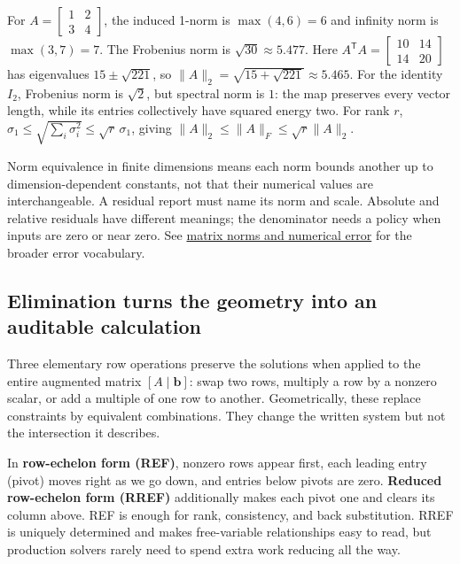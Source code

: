 For \(A=\begin{bmatrix}1&2\\3&4\end{bmatrix}\), the induced 1-norm is \(\max(4,6)=6\) and infinity norm is \(\max(3,7)=7\). The Frobenius norm is \(\sqrt{30}\approx5.477\). Here \(A^\mathsf TA=\begin{bmatrix}10&14\\14&20\end{bmatrix}\) has eigenvalues \(15\pm\sqrt{221}\), so \(\|A\|_2=\sqrt{15+\sqrt{221}}\approx5.465\). For the identity \(I_2\), Frobenius norm is \(\sqrt2\), but spectral norm is \(1\): the map preserves every vector length, while its entries collectively have squared energy two. For rank \(r\), \(\sigma_1\le\sqrt{\sum_i\sigma_i^2}\le\sqrt r\,\sigma_1\), giving \(\|A\|_2\le\|A\|_F\le\sqrt r\|A\|_2\).

Norm equivalence in finite dimensions means each norm bounds another up to dimension-dependent constants, not that their numerical values are interchangeable. A residual report must name its norm and scale. Absolute and relative residuals have different meanings; the denominator needs a policy when inputs are zero or near zero. See \hyperref[01-foundations-i-ch019]{matrix norms and numerical error} for the broader error vocabulary.

\subsection{Elimination turns the geometry into an auditable calculation}\label{elimination-turns-the-geometry-into-an-auditable-calculation}

Three elementary row operations preserve the solutions when applied to the entire augmented matrix \([A\mid\mathbf b]\): swap two rows, multiply a row by a nonzero scalar, or add a multiple of one row to another. Geometrically, these replace constraints by equivalent combinations. They change the written system but not the intersection it describes.

In \textbf{row-echelon form (REF)}, nonzero rows appear first, each leading entry (pivot) moves right as we go down, and entries below pivots are zero. \textbf{Reduced row-echelon form (RREF)} additionally makes each pivot one and clears its column above. REF is enough for rank, consistency, and back substitution. RREF is uniquely determined and makes free-variable relationships easy to read, but production solvers rarely need to spend extra work reducing all the way.

